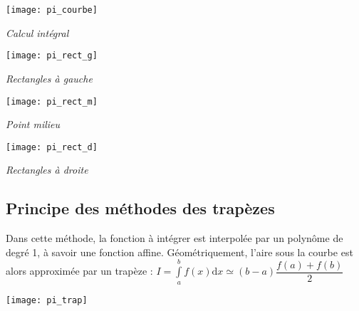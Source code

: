 \begin{figure*}[!h]
\begin{minipage}[c]{.24\linewidth}
\begin{center}
\texttt{[image: pi\_courbe]}

\textit{Calcul intégral}
\end{center}
\end{minipage}\hfill
\begin{minipage}[c]{.24\linewidth}
\begin{center}
\texttt{[image: pi\_rect\_g]}

\textit{Rectangles à gauche}
\end{center}
\end{minipage}\hfill
\begin{minipage}[c]{.24\linewidth}
\begin{center}
\texttt{[image: pi\_rect\_m]}

\textit{Point milieu}
\end{center}
\end{minipage}\hfill
\begin{minipage}[c]{.24\linewidth}
\begin{center}
\texttt{[image: pi\_rect\_d]}

\textit{Rectangles à droite}
\end{center}
\end{minipage}
\end{figure*}


\subsection{Principe des méthodes des trapèzes}

\begin{defi}
Dans cette méthode, la fonction à intégrer est interpolée par un polynôme de degré 1, à savoir une fonction affine. Géométriquement, l'aire sous la courbe est alors approximée par un trapèze :
$I = \int\limits_a^{b} f(x) \mathrm{d}x \simeq \left(b-a\right) \dfrac{f(a)+f(b)}{2} $
\end{defi}


\begin{marginfigure}
\texttt{[image: pi\_trap]}
\end{marginfigure}
 
